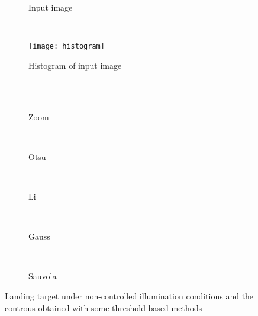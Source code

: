 \begin{figure}[!ht]
    \centering
    \begin{subfigure}[b]{0.3\textwidth}
        \caption{Input image}
        \label{fig:input_image}
    \end{subfigure}
    ~ %
    \begin{subfigure}[b]{0.3\textwidth}
        \texttt{[image: histogram]}
        \caption{Histogram of input image}
        \label{fig:histogram}
    \end{subfigure}\\
        ~ %
    \begin{subfigure}[b]{0.16\textwidth}
        \caption{Zoom}
        \label{fig:tar4_zoom}
    \end{subfigure}
        ~ %
    \begin{subfigure}[b]{0.16\textwidth}
        \caption{Otsu}
        \label{fig:otsu_th}
    \end{subfigure}
        ~ %
    \begin{subfigure}[b]{0.16\textwidth}
        \caption{Li}
        \label{fig:li_th}
    \end{subfigure}
        ~ %
    \begin{subfigure}[b]{0.16\textwidth}
        \caption{Gauss }
        \label{fig:gauss_th}
    \end{subfigure}
        ~ %
    \begin{subfigure}[b]{0.16\textwidth}
        \caption{Sauvola}
        \label{fig:sauvola_th}
    \end{subfigure}
    \caption{Landing target under non-controlled illumination conditions and the controus obtained with some threshold-based methods}\label{fig:thresholding_comp}
\end{figure}

